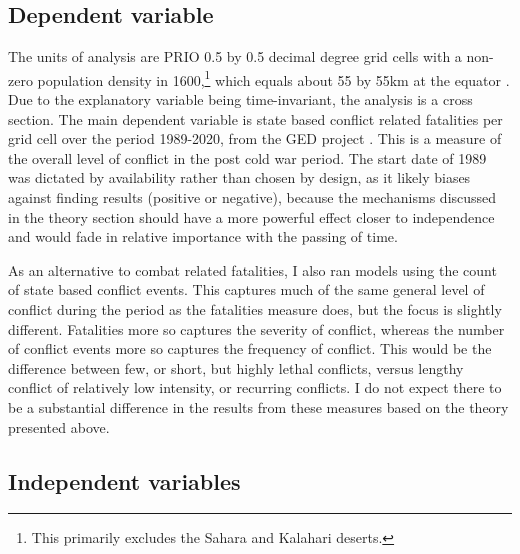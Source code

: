 \documentclass[12pt]{article}
\begin{document}
\subsection{Dependent variable} \label{Dependent variable}

The units of analysis are PRIO 0.5 by 0.5 decimal degree grid cells with a
non-zero population density in 1600,\footnote{This primarily excludes the Sahara
and Kalahari deserts.} which equals about 55 by 55km at the equator
\citep{Tollefsen2012}. Due to the explanatory variable being time-invariant, the
analysis is a cross section. The main dependent variable is state based conflict
related fatalities per grid cell over the period 1989-2020, from the GED project
\citep{Sundberg2013}. This is a measure of the overall level of conflict in the
post cold war period. The start date of 1989 was dictated by availability rather
than chosen by design, as it likely biases against finding results (positive or
negative), because the mechanisms discussed in the theory section should have a
more powerful effect closer to independence and would fade in relative
importance with the passing of time.

As an alternative to combat related fatalities, I also ran models using the
count of state based conflict events. This captures much of the same general
level of conflict during the period as the fatalities measure does, but the
focus is slightly different. Fatalities more so captures the severity of
conflict, whereas the number of conflict events more so captures the frequency
of conflict. This would be the difference between few, or short, but highly
lethal conflicts, versus lengthy conflict of relatively low intensity, or
recurring conflicts. I do not expect there to be a substantial difference in the
results from these measures based on the theory presented above.


\subsection{Independent variables} \label{Independent variable}
\end{document}
